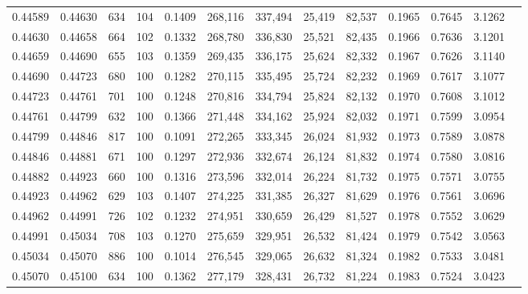 \begin{tabular}{rrrrrrrrrrrrr}
0.44589 & 0.44630 &   634 & 104 &                                     0.1409 & 268,116 & 337,494 &  25,419 &  82,537 & 0.1965 & 0.7645 & 3.1262 \\
0.44630 & 0.44658 &   664 & 102 &                                     0.1332 & 268,780 & 336,830 &  25,521 &  82,435 & 0.1966 & 0.7636 & 3.1201 \\
0.44659 & 0.44690 &   655 & 103 &                                     0.1359 & 269,435 & 336,175 &  25,624 &  82,332 & 0.1967 & 0.7626 & 3.1140 \\
0.44690 & 0.44723 &   680 & 100 &                                     0.1282 & 270,115 & 335,495 &  25,724 &  82,232 & 0.1969 & 0.7617 & 3.1077 \\
0.44723 & 0.44761 &   701 & 100 &                                     0.1248 & 270,816 & 334,794 &  25,824 &  82,132 & 0.1970 & 0.7608 & 3.1012 \\
0.44761 & 0.44799 &   632 & 100 &                                     0.1366 & 271,448 & 334,162 &  25,924 &  82,032 & 0.1971 & 0.7599 & 3.0954 \\
0.44799 & 0.44846 &   817 & 100 &                                     0.1091 & 272,265 & 333,345 &  26,024 &  81,932 & 0.1973 & 0.7589 & 3.0878 \\
0.44846 & 0.44881 &   671 & 100 &                                     0.1297 & 272,936 & 332,674 &  26,124 &  81,832 & 0.1974 & 0.7580 & 3.0816 \\
0.44882 & 0.44923 &   660 & 100 &                                     0.1316 & 273,596 & 332,014 &  26,224 &  81,732 & 0.1975 & 0.7571 & 3.0755 \\
0.44923 & 0.44962 &   629 & 103 &                                     0.1407 & 274,225 & 331,385 &  26,327 &  81,629 & 0.1976 & 0.7561 & 3.0696 \\
0.44962 & 0.44991 &   726 & 102 &                                     0.1232 & 274,951 & 330,659 &  26,429 &  81,527 & 0.1978 & 0.7552 & 3.0629 \\
0.44991 & 0.45034 &   708 & 103 &                                     0.1270 & 275,659 & 329,951 &  26,532 &  81,424 & 0.1979 & 0.7542 & 3.0563 \\
0.45034 & 0.45070 &   886 & 100 &                                     0.1014 & 276,545 & 329,065 &  26,632 &  81,324 & 0.1982 & 0.7533 & 3.0481 \\
0.45070 & 0.45100 &   634 & 100 &                                     0.1362 & 277,179 & 328,431 &  26,732 &  81,224 & 0.1983 & 0.7524 & 3.0423 \\

\end{tabular}
